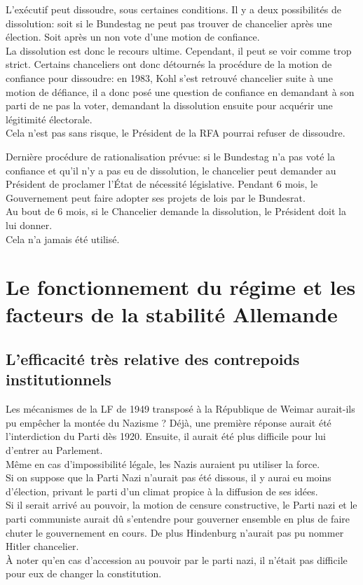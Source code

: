 \documentclass[10pt, a4paper, openany]{book}
\begin{document}
L'exécutif peut dissoudre, sous certaines conditions. Il y a deux possibilités de dissolution: soit si le Bundestag ne peut pas trouver de chancelier après une élection. Soit après un non vote d'une motion de confiance. \\
La dissolution est donc le recours ultime. Cependant, il peut se voir comme trop strict. Certains chanceliers ont donc détournés la procédure de la motion de confiance pour dissoudre: en 1983, Kohl s'est retrouvé chancelier suite à une motion de défiance, il a donc posé une question de confiance en demandant à son parti de ne pas la voter, demandant la dissolution ensuite pour acquérir une légitimité électorale. \\
Cela n'est pas sans risque, le Président de la RFA pourrai refuser de dissoudre.  


Dernière procédure de rationalisation prévue: si le Bundestag n'a pas voté la confiance et qu'il n'y a pas eu de dissolution, le chancelier peut demander au Président de proclamer l'État de nécessité législative. Pendant 6 mois, le Gouvernement peut faire adopter ses projets de lois par le Bundesrat. \\
Au bout de 6 mois, si le Chancelier demande la dissolution, le Président doit la lui donner. \\
Cela n'a jamais été utilisé. 

\section{Le fonctionnement du régime et les facteurs de la stabilité Allemande}

\subsection{L'efficacité très relative des contrepoids institutionnels}

Les mécanismes de la LF de 1949 transposé à la République de Weimar aurait-ils pu empêcher la montée du Nazisme ? Déjà, une première réponse aurait été l'interdiction du Parti dès 1920. Ensuite, il aurait été plus difficile pour lui d'entrer au Parlement. \\
Même en cas d'impossibilité légale, les Nazis auraient pu utiliser la force. \\
Si on suppose que la Parti Nazi n'aurait pas été dissous, il y aurai eu moins d'élection, privant le parti d'un climat propice à la diffusion de ses idées. \\
Si il serait arrivé au pouvoir, la motion de censure constructive, le Parti nazi et le parti communiste aurait dû s'entendre pour gouverner ensemble en plus de faire chuter le gouvernement en cours. De plus Hindenburg n'aurait pas pu nommer Hitler chancelier. \\
À noter qu'en cas d'accession au pouvoir par le parti nazi, il n'était pas difficile pour eux de changer la constitution. 
\end{document}
